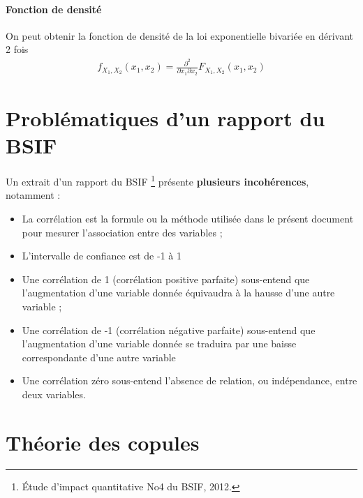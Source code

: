 \documentclass[10pt, french]{article}
\begin{document}
\begin{multicols*}{2}
\paragraph{Fonction de densité} On peut obtenir la fonction de densité de la loi exponentielle bivariée en dérivant 2 fois
\begin{align*}
f_{X_1, X_2}(x_1, x_2) = \frac{\partial^2}{\partial x_1 \partial x_2} F_{X_1, X_2}(x_1, x_2)
\end{align*}



\section{Problématiques d'un rapport du BSIF}
Un extrait d'un rapport du BSIF \footnote{Étude d'impact quantitative No4 du BSIF, 2012.}  présente \textbf{plusieurs incohérences}, notamment : 

\begin{itemize}
\item La corrélation est la formule ou la méthode utilisée dans le présent document pour mesurer l'association entre des variables ; 
\item L'intervalle de confiance est de -1  à 1
\item Une corrélation de 1 (corrélation positive parfaite) sous-entend que l'augmentation d'une variable donnée équivaudra à la hausse d'une autre variable ;
\item Une corrélation de -1 (corrélation négative parfaite) sous-entend que l'augmentation d'une variable donnée se traduira par une baisse correspondante d'une autre variable
\item Une corrélation zéro sous-entend l'absence de relation, ou indépendance, entre deux variables.
\end{itemize}



\section{Théorie des copules}


\end{multicols*}
\end{document}

